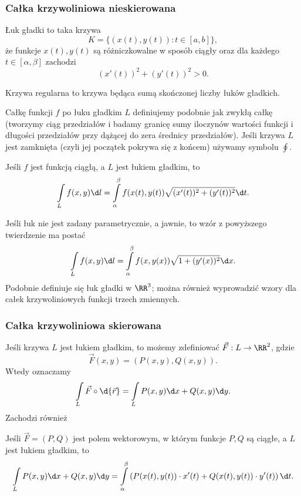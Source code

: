 \subsubsection{Całka krzywoliniowa nieskierowana}
\begin{definition}
    Łuk gładki to taka krzywa
    \[ K = \{(x(t), y(t)) : t \in [a, b]\}, \]
    że funkcje $x(t), y(t)$ są różniczkowalne w sposób ciągły oraz dla każdego $t \in [\alpha, \beta]$ zachodzi
    \[ (x'(t))^2 + (y'(t))^2 > 0. \]
\end{definition}

\begin{definition}
    Krzywa regularna to krzywa będąca sumą skończonej liczby łuków gładkich.
\end{definition}

Całkę funkcji $f$ po łuku gładkim $L$ definiujemy podobnie jak zwykłą całkę (tworzymy ciąg przedziałów i badamy granicę sumy iloczynów wartości funkcji i długości przedziałów przy dążącej do zera średnicy przedziałów). Jeśli krzywa $L$ jest zamknięta (czyli jej początek pokrywa się z końcem) używamy symbolu $\oint$.

\begin{theorem}
    Jeśli $f$ jest funkcją ciągłą, a $L$ jest łukiem gładkim, to
    \[ \int\limits_L f(x, y) \d l = \int\limits_\alpha^\beta f(x(t), y(t))\sqrt{(x'(t))^2 + (y'(t))^2} \d t. \]
\end{theorem}

Jeśli łuk nie jest zadany parametrycznie, a jawnie, to wzór z powyższego twierdzenie ma postać
\[ \int\limits_L f(x, y) \d l = \int\limits_\alpha^\beta f(x, y(x))\sqrt{1 + (y'(x))^2} \d x. \]
Podobnie definiuje się łuk gładki w $\RR^3$; można również wyprowadzić wzory dla całek krzywoliniowych funkcji trzech zmiennych.

\subsubsection{Całka krzywoliniowa skierowana}
Jeśli krzywa $L$ jest łukiem gładkim, to możemy zdefiniować  $\vec{F} : L \to \RR^2$, gdzie
\[ \vec{F}(x, y) = (P(x, y), Q(x, y)). \]
Wtedy  oznaczamy
\[ \int\limits_L \vec{F} \circ \d{\vec{r}} = \int\limits_L P(x, y) \d x + Q(x, y) \d y. \]
Zachodzi również

\begin{theorem}
    Jeśli $\vec{F} = (P, Q)$ jest polem wektorowym, w którym funkcje $P, Q$  są ciągłe, a $L$ jest łukiem gładkim, to
    \[ \int\limits_L P(x, y) \d x + Q(x, y) \d y = \int\limits_\alpha^\beta \left(P(x(t), y(t))\cdot x'(t) + Q(x(t), y(t))\cdot y'(t)\right) \d t. \]
\end{theorem}

